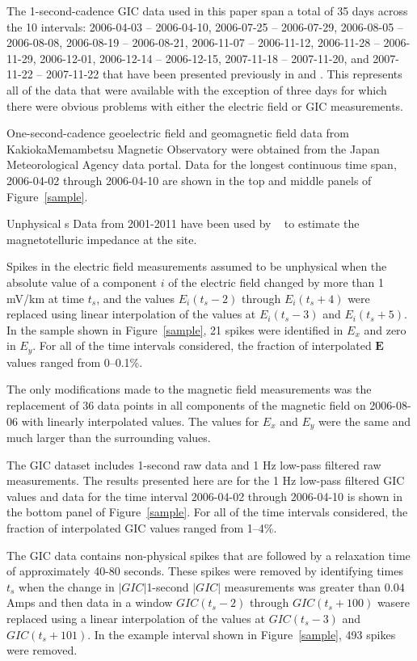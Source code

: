 \documentclass[draft,linenumbers]{agujournal2018}
\begin{document}
The 1-second-cadence GIC data used in this paper span a total of 35 days across the 10 intervals: 2006-04-03 -- 2006-04-10, 2006-07-25 -- 2006-07-29, 2006-08-05 -- 2006-08-08, 2006-08-19 -- 2006-08-21, 2006-11-07 -- 2006-11-12, 2006-11-28 -- 2006-11-29, 2006-12-01, 2006-12-14 -- 2006-12-15, 2007-11-18 -- 2007-11-20, and 2007-11-22 -- 2007-11-22 that have been presented previously in \citet{Watari2009} and \cite{Watari2015}. This represents all of the data that were available with the exception of three days for which there were obvious problems with either the electric field or GIC measurements.

One-second-cadence geoelectric field and geomagnetic field data from KakiokaMemambetsu Magnetic Observatory were obtained from the Japan Meteorological Agency data portal. Data for the longest continuous time span, 2006-04-02 through 2006-04-10 are shown in the top and middle panels of Figure~\ref{sample}.

Unphysical s Data from 2001-2011 have been used by ~\cite{Fujii2015} to estimate the magnetotelluric impedance at the site.

Spikes in the electric field measurements assumed to be unphysical when the absolute value of a component $i$ of the electric field changed by more than 1 mV/km at time $t_s$, and the values $E_i(t_s-2)$ through $E_i(t_s+4)$ were replaced using linear interpolation of the values at $E_i(t_s-3)$ and $E_i(t_s + 5)$. In the sample shown in Figure~\ref{sample}, 21 spikes were identified in $E_x$ and zero in $E_y$. For all of the time intervals considered, the fraction of interpolated $\mathbf{E}$ values ranged from 0--0.1\%.

The only modifications made to the magnetic field measurements was the replacement of 36 data points in all components of the magnetic field on 2006-08-06 with linearly interpolated values. The values for $E_x$ and $E_y$ were the same and much larger than the surrounding values.

The GIC dataset includes 1-second raw data and 1 Hz low-pass filtered raw measurements.  The results presented here are for the 1 Hz low-pass filtered GIC values and data for the time interval 2006-04-02 through 2006-04-10 is shown in the bottom panel of Figure~\ref{sample}. For all of the time intervals considered, the fraction of interpolated GIC values ranged from 1--4\%.

The GIC data contains non-physical spikes that are followed by a relaxation time of approximately  40-80 seconds. These spikes were removed by identifying times $t_s$ when the change in $|GIC|$1-second $|GIC|$ measurements was greater than $0.04$ Amps and then data in a window $GIC(t_s-2)$ through $GIC(t_s+100)$ wasere replaced using a linear interpolation of the values at $GIC(t_s-3)$ and $GIC(t_s + 101)$. In the example interval shown in Figure~\ref{sample}, 493 spikes were removed.
\end{document}
